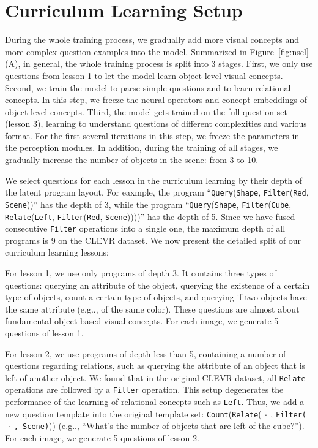 \documentclass{article} \usepackage{iclr2019_conference,times}
\makeatletter
\newcommand{\fig}[1]{Figure~\ref{#1}}
\DeclareRobustCommand\onedot{\futurelet\@let@token\@onedot}
\def\@onedot{\ifx\@let@token.\else.\null\fi\xspace}
\def\eg{e.g\onedot} \def\Eg{E.g\onedot}
\makeatother
\begin{document}
\section{Curriculum Learning Setup}
\label{sec:app:curriculum}

During the whole training process, we gradually add more visual concepts and more complex question examples into the model. 
Summarized in \fig{fig:nscl}(A), in general, the whole training process is split into 3 stages. 
First, we only use questions from lesson 1 to let the model learn object-level visual concepts. Second, we train the model to parse simple questions and to learn relational concepts. In this step, we freeze the neural operators and concept embeddings of object-level concepts. Third, the model gets trained on the full question set (lesson 3), learning to understand questions of different complexities and various format. For the first several iterations in this step, we freeze the parameters in the perception modules. In addition, during the training of all stages, we gradually increase the number of objects in the scene: from 3 to 10.

We select questions for each lesson in the curriculum learning by their depth of the latent program layout. For eaxmple, the program ``\texttt{Query}(\texttt{Shape}, \texttt{Filter}(\texttt{Red}, \texttt{Scene}))'' has the depth of 3, while the program  ``\texttt{Query}(\texttt{Shape},
\texttt{Filter}(\texttt{Cube}, \texttt{Relate}(\texttt{Left}, \texttt{Filter}(\texttt{Red}, \texttt{Scene}))))'' has the depth of 5. Since we have fused  consecutive \texttt{Filter} operations into a single one, the maximum depth of all programs is $9$ on the CLEVR dataset. We now present the detailed split of our curriculum learning lessons:

For lesson 1, we use only programs of depth 3. It contains three types of questions: querying an attribute of the object, querying the existence of a certain type of objects, count a certain type of objects, and querying if two objects have the same attribute (\eg, of the same color). These questions are almost about fundamental object-based visual concepts. For each image, we generate 5 questions of lesson 1.

For lesson 2, we use programs of depth less than 5, containing a number of questions regarding relations, such as querying the attribute of an object that is left of another object. We found that in the original CLEVR dataset, all \texttt{Relate} operations are followed by a \texttt{Filter} operation. This setup degenerates the performance of the learning of relational concepts such as \texttt{Left}. Thus, we add a new question template into the original template set: \texttt{Count}(\texttt{Relate}($~\cdot~$, \texttt{Filter($~\cdot~$, \texttt{Scene})})) (\eg, ``What's the number of objects that are left of the cube?''). For each image, we generate 5 questions of lesson 2.
\end{document}
